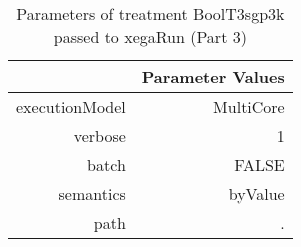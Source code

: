\begin{table}[ht]
\centering
\begin{tabular}{rr}
  \hline
 & Parameter Values \\ 
  \hline
executionModel & MultiCore \\ 
  verbose & 1 \\ 
  batch & FALSE \\ 
  semantics & byValue \\ 
  path & . \\ 
   \hline
\end{tabular}
\caption{ Parameters of treatment BoolT3sgp3k passed to xegaRun
 (Part 3)} 
\end{table}
